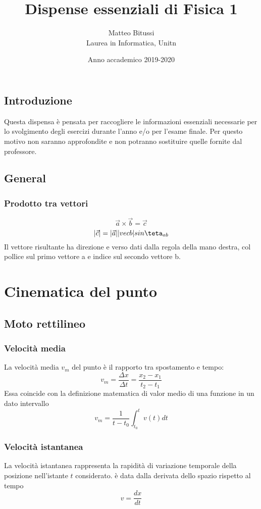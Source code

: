 \documentclass[a4paper]{report}
\title{Dispense essenziali di Fisica 1}
\author{Matteo Bitussi \\ Laurea in Informatica, Unitn}
\date{Anno accademico 2019-2020}
\begin{document}
  \maketitle

  \tableofcontents

  \section*{Introduzione}
  Questa dispensa è pensata per raccogliere le informazioni essenziali necessarie per lo svolgimento degli esercizi durante l'anno e/o per l'esame finale. Per questo motivo non saranno approfondite e non potranno sostituire quelle fornite dal professore.

  \section*{General}
  \subsection{Prodotto tra vettori}
  \[ \vec{a} \times \vec{b} = \vec{c} \]
  \[ |\vec{c}| = |\vec{a}||vec{b}| sin \teta_{ab} \]
  Il vettore risultante ha direzione e verso dati dalla regola della mano destra, col pollice sul primo vettore a e indice sul secondo vettore b.

  \chapter{Cinematica del punto}
  \section{Moto rettilineo}
  \subsection{Velocità media}
  La velocità media $v_m$ del punto è il rapporto tra spostamento e tempo:
  \[ v_m = \frac{\Delta x}{\Delta t} = \frac{x_2 - x_1}{t_2 - t_1} \]
  Essa coincide con la definizione matematica di valor medio di una funzione in un dato intervallo
  \[ v_m = \frac{1}{t-t_0} \int_{t_0}^t v(t) dt \]
  \subsection{Velocità istantanea}
  La velocità istantanea  rappresenta la rapidità di variazione temporale della posizione nell'istante $t$ considerato. è data dalla derivata dello spazio rispetto al tempo
  \[ v = \frac{dx}{dt} \]
\end{document}
